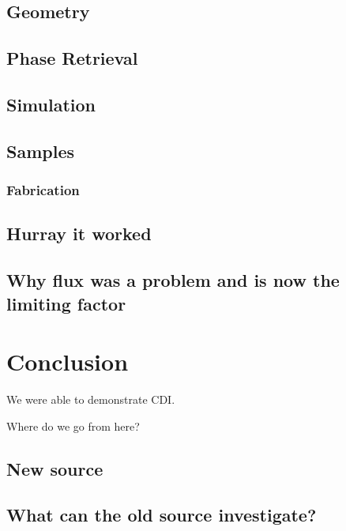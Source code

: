 \section{Geometry}

\section{Phase Retrieval}

\section{Simulation}

\section{Samples}

\subsection{Fabrication}

\section{Hurray it worked}

\section{Why flux was a problem and is now the limiting factor}



\chapter{Conclusion}

We were able to demonstrate CDI.

Where do we go from here?

\section{New source}

\section{What can the old source investigate?}


